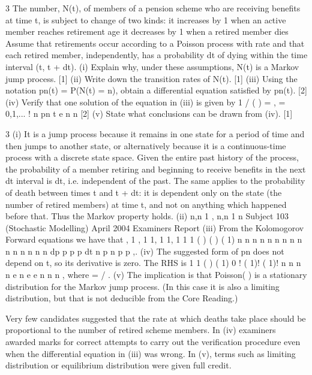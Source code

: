 \documentclass[a4paper,12pt]{article}
\begin{document}
3 The number, N(t), of members of a pension scheme who are receiving benefits at time
t, is subject to change of two kinds:
it increases by 1 when an active member reaches retirement age
it decreases by 1 when a retired member dies
Assume that retirements occur according to a Poisson process with rate and that
each retired member, independently, has a probability dt of dying within the time
interval (t, t + dt).
(i) Explain why, under these assumptions, N(t) is a Markov jump process. [1]
(ii) Write down the transition rates of N(t). [1]
(iii) Using the notation pn(t) = P(N(t) = n), obtain a differential equation satisfied
by pn(t). [2]
(iv) Verify that one solution of the equation in (iii) is given by
1 /
( ) = , = 0,1,...
!
n
pn t e n
n
[2]
(v) State what conclusions can be drawn from (iv). [1]

3 (i) It is a jump process because it remains in one state for a period of time and
then jumps to another state, or alternatively because it is a continuous-time
process with a discrete state space.
Given the entire past history of the process, the probability of a member
retiring and beginning to receive benefits in the next dt interval is dt, i.e.
independent of the past. The same applies to the probability of death between
times t and t + dt: it is dependent only on the state (the number of retired
members) at time t, and not on anything which happened before that. Thus the
Markov property holds.
(ii) n,n 1 , n,n 1 n
Subject 103 (Stochastic Modelling) April 2004 Examiners Report
(iii) From the Kolomogorov Forward equations we have that
, 1 , 1 1, 1 1, 1
1 1
( )
( ) ( 1)
n
n n n n n n n n n n n
n n n
dp
p p p
dt
n p n p p
,.
(iv) The suggested form of pn does not depend on t, so its derivative is zero. The
RHS is
1 1
( ) ( 1) 0
! ( 1)! ( 1)!
n n n
n e n e e
n n n
,
where = / .
(v) The implication is that Poisson( ) is a stationary distribution for the Markov
jump process. (In this case it is also a limiting distribution, but that is not
deducible from the Core Reading.)
\newpage

Very few candidates suggested that the rate at which deaths take place should be
proportional to the number of retired scheme members.
In (iv) examiners awarded marks for correct attempts to carry out the verification procedure even when the differential equation in (iii) was wrong.
In (v), terms such as limiting distribution or equilibrium distribution were given full credit.
\end{document}
